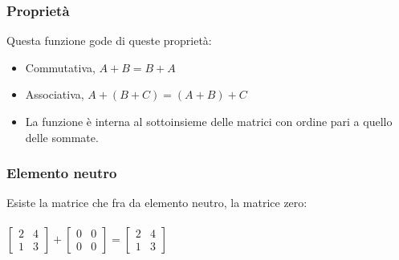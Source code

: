 \documentclass[a4paper]{article}
\begin{document}
\subsubsection{Proprietà}
Questa funzione gode di queste proprietà:
\begin{itemize}
\item Commutativa, $A + B = B + A$
\item Associativa, $A + (B + C) = (A + B) + C$
\item La funzione è interna al sottoinsieme delle matrici con ordine pari a quello delle sommate.
\end{itemize}
\subsubsection{Elemento neutro}
Esiste la matrice che fra da elemento neutro, la matrice zero: 
\\
\\
$\left[\begin{matrix}2 & 4 \\ 1 & 3\end{matrix}\right] + \left[\begin{matrix}0 & 0 \\ 0 & 0\end{matrix}\right] = \left[\begin{matrix}2 & 4 \\ 1 & 3\end{matrix}\right]
$
\end{document}
